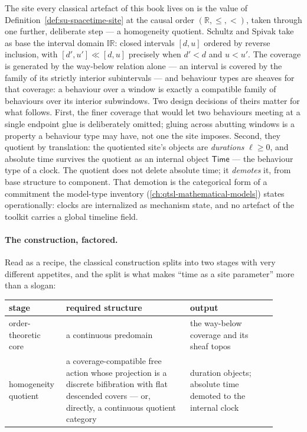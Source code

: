 The site every classical
artefact of this book lives on is the value of
Definition~\ref{def:su-spacetime-site} at the causal order
$(\mathbb{R}, \le, <)$, taken through one further, deliberate step
--- a homogeneity quotient. Schultz and Spivak
\cite{schultz17} take as base the interval domain $\mathbb{IR}$:
closed intervals $[d,u]$ ordered by reverse inclusion, with
$[d',u'] \ll [d,u]$ precisely when $d' < d$ and $u < u'$. The coverage
is generated by the way-below relation alone --- an interval is
covered by the family of its strictly interior subintervals --- and
behaviour types are sheaves for that coverage: a behaviour over a
window is exactly a compatible family of behaviours over its interior
subwindows. Two design decisions of theirs matter for what follows.
First, the finer coverage that would let two behaviours meeting at a
single endpoint glue is deliberately omitted; gluing across abutting
windows is a property a behaviour type may have, not one the site
imposes. Second, they quotient by translation: the quotiented site's
objects are \emph{durations} $\ell \ge 0$, and absolute time survives
the quotient as an internal object $\mathsf{Time}$ --- the behaviour
type of a clock. The quotient does not delete absolute time; it
\emph{demotes} it, from base structure to component. That demotion is
the categorical form of a commitment the model-type inventory
(\autoref{ch:qtsl-mathematical-models}) states operationally: clocks are
internalized as mechanism state, and no artefact of the toolkit
carries a global timeline field.

\paragraph{The construction, factored.} Read as a recipe, the
classical construction splits into two stages with very different
appetites, and the split is what makes ``time as a site parameter''
more than a slogan:

\begin{center}
\small
\begin{tabular}{@{}p{0.17\linewidth}p{0.43\linewidth}p{0.30\linewidth}@{}}
\toprule
\textbf{stage} & \textbf{required structure} & \textbf{output} \\
\midrule
order-theoretic core & a continuous predomain & the way-below
coverage and its sheaf topos \\
homogeneity quotient & a coverage-compatible free action whose
projection is a discrete bifibration with flat descended covers ---
or, directly, a continuous quotient category & duration objects;
absolute time demoted to the internal clock \\
\bottomrule
\end{tabular}
\end{center}

